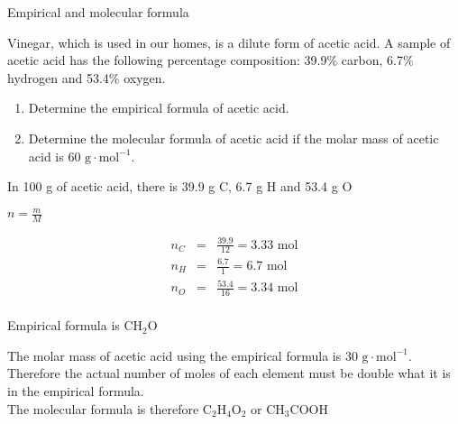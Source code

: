 \begin{wex}{Empirical and molecular formula\\}{Vinegar, which is used in our homes, is a dilute form of acetic acid. A sample of acetic acid has the following percentage composition: 39.9\% carbon, 6.7\% hydrogen and 53.4\% oxygen.

\begin{enumerate}
\item{Determine the empirical formula of acetic acid.}
\item{Determine the molecular formula of acetic acid if the molar mass of acetic acid is $60 \text{ g} \cdot \text{mol}^{-1}$.}
\end{enumerate}
}

{

In 100 g of acetic acid, there is 39.9 g C, 6.7 g H and 53.4 g O \\
}

{

$n= \frac{m}{M}$

\begin{eqnarray*}
n_C&=& \frac{39.9}{12} = 3.33 \text{ mol} \\
n_H&=& \frac{6.7}{1} = 6.7 \text{ mol}  \\
n_O&=& \frac{53.4}{16} = 3.34 \text{ mol} \\
\end{eqnarray*}
}

{

Empirical formula is CH$_2$O\\
}

{

The molar mass of acetic acid using the empirical formula is $30 \text{ g} \cdot \text{mol}^{-1}$. Therefore the actual number of moles of each element must be double what it is in the empirical formula.\\

The molecular formula is therefore C$_2$H$_4$O$_2$ or CH$_3$COOH
}
\end{wex}


